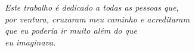 \begin{dedicatoria}
   \vspace*{\fill}
   \centering
   \noindent
   \textit{Este trabalho é dedicado a todas as pessoas que,\\
por ventura, cruzaram meu caminho e acreditaram\\
que eu poderia ir muito além do que\\
eu imaginava.} \vspace*{\fill}
\end{dedicatoria}
